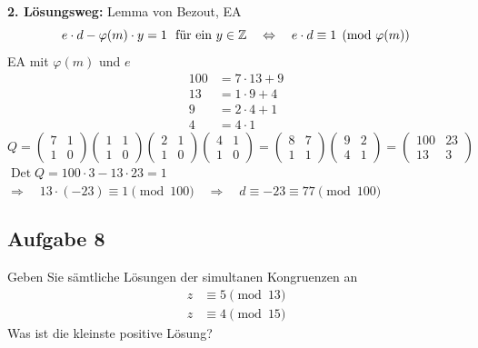 \begin{loesung}
\textbf{2. Lösungsweg:} Lemma von Bezout, EA
\[
e \cdot d - \varphi(m) \cdot y = 1 \ \text{ für ein } y \in \mathbb{Z} \quad\Leftrightarrow\quad e \cdot d \equiv 1 \pmod{\varphi(m)}
\]
EA mit $\varphi(m)$ und $e$
\begin{align*}
100 &= 7 \cdot 13 + 9\\
13 &= 1 \cdot 9 + 4\\
9 &= 2 \cdot 4 + 1\\
4 &= 4 \cdot 1
\end{align*}
\[
Q = \begin{pmatrix} 7 & 1\\ 1 & 0\end{pmatrix}
\begin{pmatrix} 1 & 1\\ 1 & 0\end{pmatrix}
\begin{pmatrix} 2 & 1\\ 1 & 0\end{pmatrix}
\begin{pmatrix} 4 & 1\\ 1 & 0\end{pmatrix}
= \begin{pmatrix} 8 & 7\\ 1 & 1\end{pmatrix}
\begin{pmatrix} 9 & 2\\ 4 & 1\end{pmatrix}
= \begin{pmatrix} 100 & 23\\ 13 & 3\end{pmatrix}
\]
$\operatorname{Det} Q = 100 \cdot 3 - 13 \cdot 23 = 1$\\
$\Rightarrow\quad 13 \cdot (-23) \equiv 1 \pmod{100} \quad\Rightarrow\quad d \equiv -23 \equiv 77 \pmod{100}$
\end{loesung}

\subsection{Aufgabe 8}

\begin{aufgabe}[Aufgabe 8]
Geben Sie sämtliche Lösungen der simultanen Kongruenzen an
\begin{align*}
z &\equiv 5 \pmod{13}\\
z &\equiv 4 \pmod{15}
\end{align*}
Was ist die kleinste positive Lösung?
\end{aufgabe}

